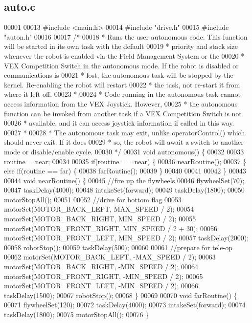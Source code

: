 \subsection{auto.\+c}
\label{auto_8c_source}

\begin{DoxyCode}
00001 
00013 \textcolor{preprocessor}{#include <main.h>}
00014 \textcolor{preprocessor}{#include "drive.h"}
00015 \textcolor{preprocessor}{#include "auton.h"}
00016 
00017 \textcolor{comment}{/*}
00018 \textcolor{comment}{ * Runs the user autonomous code. This function will be started in its own task with the default}
00019 \textcolor{comment}{ * priority and stack size whenever the robot is enabled via the Field Management System or the}
00020 \textcolor{comment}{ * VEX Competition Switch in the autonomous mode. If the robot is disabled or communications is}
00021 \textcolor{comment}{ * lost, the autonomous task will be stopped by the kernel. Re-enabling the robot will restart}
00022 \textcolor{comment}{ * the task, not re-start it from where it left off.}
00023 \textcolor{comment}{ *}
00024 \textcolor{comment}{ * Code running in the autonomous task cannot access information from the VEX Joystick. However,}
00025 \textcolor{comment}{ * the autonomous function can be invoked from another task if a VEX Competition Switch is not}
00026 \textcolor{comment}{ * available, and it can access joystick information if called in this way.}
00027 \textcolor{comment}{ *}
00028 \textcolor{comment}{ * The autonomous task may exit, unlike operatorControl() which should never exit. If it does}
00029 \textcolor{comment}{ * so, the robot will await a switch to another mode or disable/enable cycle.}
00030 \textcolor{comment}{ */}
00031 \textcolor{keywordtype}{void} autonomous() \{
00032 
00033   routine = near;
00034 
00035   \textcolor{keywordflow}{if}(routine == near) \{
00036     nearRoutine();
00037   \} \textcolor{keywordflow}{else} \textcolor{keywordflow}{if}(routine == far) \{
00038     farRoutine();
00039   \}
00040 
00041 
00042 \}
00043 
00044 \textcolor{keywordtype}{void} nearRoutine() \{
00045   \textcolor{comment}{//fire up the flywheels}
00046   flywheelSet(70);
00047   taskDelay(4000);
00048   intakeSet(forward);
00049   taskDelay(1800);
00050   motorStopAll();
00051 
00052   \textcolor{comment}{//drive for bottom flag}
00053   motorSet(MOTOR_BACK_LEFT, MAX_SPEED / 2);
00054   motorSet(MOTOR_BACK_RIGHT, MIN_SPEED / 2);
00055   motorSet(MOTOR_FRONT_RIGHT, MIN_SPEED / 2 + 30);
00056   motorSet(MOTOR_FRONT_LEFT, MIN_SPEED / 2);
00057   taskDelay(2000);
00058   robotStop();
00059   taskDelay(500);
00060 
00061   \textcolor{comment}{//prepare for tele-op}
00062   motorSet(MOTOR_BACK_LEFT, -MAX_SPEED / 2);
00063   motorSet(MOTOR_BACK_RIGHT, -MIN_SPEED / 2);
00064   motorSet(MOTOR_FRONT_RIGHT, -MIN_SPEED / 2);
00065   motorSet(MOTOR_FRONT_LEFT, -MIN_SPEED / 2);
00066   taskDelay(1500);
00067   robotStop();
00068 \}
00069 
00070 \textcolor{keywordtype}{void} farRoutine() \{
00071   flywheelSet(120);
00072   taskDelay(4000);
00073   intakeSet(forward);
00074   taskDelay(1800);
00075   motorStopAll();
00076   \}
\end{DoxyCode}
